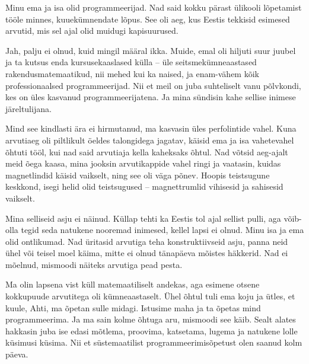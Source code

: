 \label{sisu:ahti}

Minu ema ja isa olid 
programmeerijad. Nad said kokku pärast ülikooli lõpetamist tööle minnes, 
kuuekümnendate lõpus. See oli aeg, kus Eestis tekkisid 
esimesed arvutid, mis sel ajal olid muidugi kapisuurused.


Jah, palju ei olnud, kuid 
mingil määral ikka. Muide, emal oli hiljuti  
suur juubel ja ta kutsus enda 
kursusekaaslased külla -- üle seitsmekümneaastased
rakendusmatemaatikud, nii mehed kui ka naised, ja enam-vähem kõik  
professionaalsed programmeerijad. Nii et meil on juba 
suhteliselt vanu põlvkondi, kes on üles kasvanud programmeerijatena. Ja mina 
sündisin kahe sellise inimese järeltulijana.


Mind see kindlasti ära ei hirmutanud, ma kasvasin üles perfolintide vahel. 
Kuna arvutiaeg oli piltlikult öeldes talongidega 
jagatav, käisid ema ja isa vahetevahel
õhtuti tööl, kui nad said arvutiaja kella kaheksaks õhtul. 
Nad võtsid aeg-ajalt meid õega kaasa, mina jooksin arvutikappide vahel ringi ja 
vaatasin, kuidas 
magnetlindid käisid vaikselt, ning see oli väga põnev. 
Hoopis teistsugune keskkond, isegi helid olid teistsugused -- magnettrumlid 
vihisesid ja sahisesid vaikselt.


Mina selliseid asju ei näinud. Küllap tehti ka Eestis tol ajal 
sellist pulli, aga võib-olla tegid seda natukene nooremad inimesed, kellel 
lapsi ei olnud. Minu isa ja ema olid ontlikumad. Nad 
üritasid arvutiga teha konstruktiivseid asju, panna neid 
ühel või teisel moel käima, mitte ei olnud tänapäeva mõistes häkkerid. Nad ei 
mõelnud, mismoodi näiteks arvutiga pead pesta.


Ma olin lapsena vist küll matemaatiliselt andekas, aga esimene otsene kokkupuude
arvutitega oli kümneaastaselt. Ühel õhtul tuli ema koju ja 
ütles, et kuule, Ahti, ma õpetan sulle midagi. Istusime maha ja 
ta õpetas mind programmeerima. Ja ma sain 
kolme õhtuga aru, mismoodi see käib. Sealt 
alates hakkasin juba ise edasi mõtlema, proovima, katsetama, lugema ja 
natukene lolle küsimusi küsima. Nii et süstemaatilist 
programmeerimisõpetust olen saanud kolm päeva.

